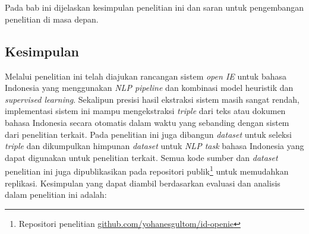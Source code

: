 \chapter{\babLima}
\label{chap:babLima}

Pada bab ini dijelaskan kesimpulan penelitian ini dan saran untuk pengembangan penelitian di masa depan.

\section{Kesimpulan}

Melalui penelitian ini telah diajukan rancangan sistem \textit{open IE} untuk bahasa Indonesia yang menggunakan \textit{NLP pipeline} dan kombinasi model heuristik dan \textit{supervised learning}. Sekalipun presisi hasil ekstraksi sistem masih sangat rendah, implementasi sistem ini mampu mengekstraksi \textit{triple} dari teks atau dokumen bahasa Indonesia secara otomatis dalam waktu yang sebanding dengan sistem dari penelitian terkait. Pada penelitian ini juga dibangun \textit{dataset} untuk seleksi \textit{triple} dan dikumpulkan himpunan \textit{dataset} untuk \textit{NLP task} bahasa Indonesia yang dapat digunakan untuk penelitian terkait. Semua kode sumber dan \textit{dataset} penelitian ini juga dipublikasikan pada repositori publik\footnote{Repositori penelitian \url{github.com/yohanesgultom/id-openie}} untuk memudahkan replikasi. Kesimpulan yang dapat diambil berdasarkan evaluasi dan analisis dalam penelitian ini adalah:

